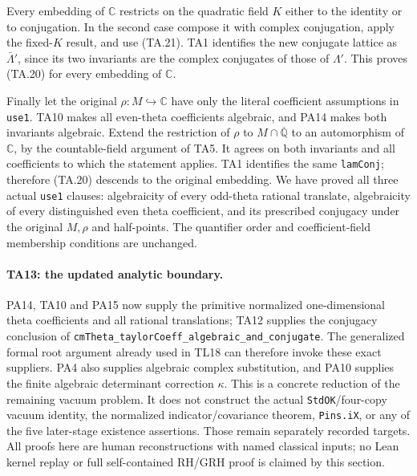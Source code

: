 Every embedding of $\mathbb C$ restricts on the quadratic
field $K$ either to the identity or to conjugation. In the
second case compose it with complex conjugation, apply the
fixed-$K$ result, and use (TA.21). TA1 identifies the new
conjugate lattice as $\bar\Lambda'$, since its two invariants
are the complex conjugates of those of $\Lambda'$. This
proves (TA.20) for every embedding of $\mathbb C$.

Finally let the original $\rho:M\hookrightarrow\mathbb C$
have only the literal coefficient assumptions in
\texttt{use1}. TA10 makes all even-theta coefficients
algebraic, and PA14 makes both invariants algebraic.
Extend the restriction of $\rho$ to
$M\cap\overline{\mathbb Q}$ to an automorphism of
$\mathbb C$, by the countable-field argument of TA5.
It agrees on both invariants and all coefficients to which
the statement applies. TA1 identifies the same
\texttt{lamConj}; therefore (TA.20) descends to the original
embedding. We have proved all three actual \texttt{use1}
clauses: algebraicity of every odd-theta rational translate,
algebraicity of every distinguished even theta coefficient,
and its prescribed conjugacy under the original $M,\rho$
and half-points. The quantifier order and coefficient-field
membership conditions are unchanged.

\paragraph{TA13: the updated analytic boundary.}
PA14, TA10 and PA15 now supply the primitive normalized
one-dimensional theta coefficients and all rational
translations; TA12 supplies the conjugacy conclusion of
\texttt{cmTheta\_taylorCoeff\_algebraic\_and\_conjugate}.
The generalized formal root argument already used in TL18
can therefore invoke these exact suppliers. PA4 also
supplies algebraic complex substitution, and PA10 supplies
the finite algebraic determinant correction $\kappa$.
This is a concrete reduction of the remaining vacuum
problem. It does not construct the actual
\texttt{StdOK}/four-copy vacuum identity, the normalized
indicator/covariance theorem, \texttt{Pins.iX}, or any of
the five later-stage existence assertions. Those remain
separately recorded targets. All proofs here are human
reconstructions with named classical inputs; no Lean
kernel replay or full self-contained RH/GRH proof is
claimed by this section.
